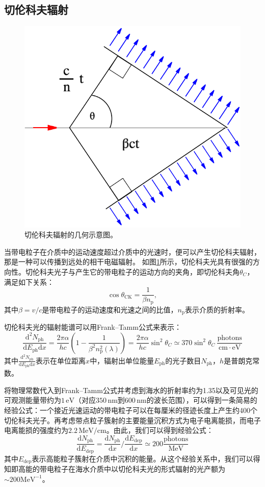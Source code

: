 \subsection{切伦科夫辐射}

\begin{figure}[htb]
    \centering
    \includegraphics[width=0.4\linewidth]{img/Cherenkov_geometry.pdf}
    \caption{切伦科夫辐射的几何示意图。}
    \label{fig:Cherenkov_geometry}
\end{figure}

当带电粒子在介质中的运动速度超过介质中的光速时，便可以产生切伦科夫辐射，那是一种可以传播到远处的相干电磁辐射。
如图\ref{fig:Cherenkov_geometry}所示，切伦科夫光具有很强的方向性。切伦科夫光子与产生它的带电粒子的运动方向的夹角，即切伦科夫角$\theta_C$，满足如下关系：
\begin{equation}
    \cos \theta_\mathrm{CK}=\frac{1}{\beta n_\mathrm{p}} , 
\end{equation}
其中$\beta = v / c$是带电粒子的运动速度和光速之间的比值，$n_\mathrm{p}$表示介质的折射率。

切伦科夫光的辐射能谱可以用Frank–Tamm公式来表示：
\begin{equation}
    \frac{\mathrm{d}^2 N_\mathrm{ph}}{\mathrm{d}E_\mathrm{ph} \mathrm{d}x} = 
    \frac{2 \pi \alpha}{hc}\left(1 - \frac{1}{\beta^2 n_\mathrm{p}^2(\lambda)} \right) = 
    \frac{2 \pi \alpha}{h c} \sin^2\theta_C \simeq 
    370 \sin^2\theta_C ~\mathrm{\frac{photons}{cm \cdot eV}}
    \label{eq:Frank–Tamm}
\end{equation}
其中$\frac{\mathrm{d}^2 N_\mathrm{ph}}{\mathrm{d}E_\mathrm{ph} \mathrm{d}x}$表示在单位距离$x$中，辐射出单位能量$E_\mathrm{ph}$的光子数目$N_\mathrm{ph}$，$h$是普朗克常数。

将物理常数代入到Frank–Tamm公式并考虑到海水的折射率约为1.35以及可见光的可观测能量带约为$1\,\mathrm{eV}$（对应$350\,\mathrm{nm}$到$600\,\mathrm{nm}$的波长范围），可以得到一条简易的经验公式：一个接近光速运动的带电粒子可以在每厘米的径迹长度上产生约400个切伦科夫光子。再考虑带点粒子簇射的主要能量沉积方式为电子电离能损，而电子电离能损的强度约为$2.2\,\mathrm{MeV/cm}$。由此，我们可以得到经验公式：
\begin{equation}
    \frac{\mathrm{d} N_\mathrm{ph}}{\mathrm{d} E_\mathrm{dep}} = 
    \frac{\mathrm{d} N_\mathrm{ph}}{\mathrm{d}x} / \frac{\mathrm{d} E_\mathrm{dep}}{\mathrm{d}x} \simeq
    200 \frac{\mathrm{photons}}{\mathrm{MeV}}
    \label{eq:emission_efficiency}
\end{equation}
其中$E_\mathrm{dep}$表示高能粒子簇射在介质中沉积的能量。从这个经验关系中，我们可以得知即高能的带电粒子在海水介质中以切伦科夫光的形式辐射的光产额为$\sim 200 \mathrm{MeV}^{-1}$。

